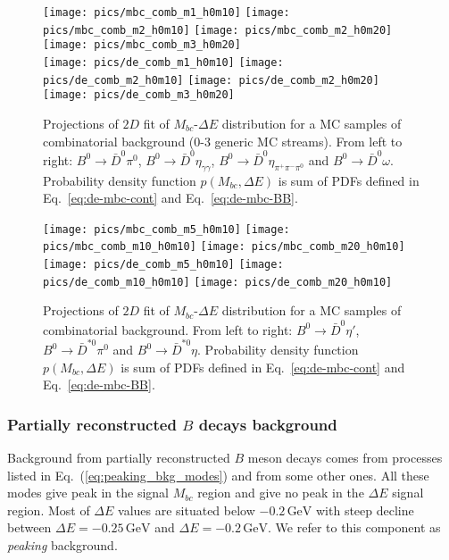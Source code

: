 \documentclass[preprint,aps,showpacs]{revtex4}
\newcommand{\bdpi}{\ensuremath{B^0\to \bar D^0\pi^0}\xspace}
\newcommand{\bdetagg}{\ensuremath{B^0\to \bar D^0\eta_{\gamma\gamma}}\xspace}
\newcommand{\bdetap}{\ensuremath{B^0\to \bar D^0\eta\prime}\xspace}
\newcommand{\bdetappp}{\ensuremath{B^0\to \bar D^0\eta_{\pi^+\pi^-\pi^0}}\xspace}
\newcommand{\bdomega}{\ensuremath{B^0\to \bar D^0\omega}\xspace}
\newcommand{\btodstpi}{\ensuremath{B^0\to \bar D^{*0}\pi^0}\xspace}
\newcommand{\btodsteta}{\ensuremath{B^0\to \bar D^{*0}\eta}\xspace}
\newcommand{\de}{\ensuremath{\Delta E}\xspace}
\newcommand{\mbc}{\ensuremath{M_{bc}}\xspace}
\begin{document}

\begin{figure}[htb]
 \texttt{[image: pics/mbc\_comb\_m1\_h0m10]}
 \texttt{[image: pics/mbc\_comb\_m2\_h0m10]}
 \texttt{[image: pics/mbc\_comb\_m2\_h0m20]}
 \texttt{[image: pics/mbc\_comb\_m3\_h0m20]}\\
 \texttt{[image: pics/de\_comb\_m1\_h0m10]}
 \texttt{[image: pics/de\_comb\_m2\_h0m10]}
 \texttt{[image: pics/de\_comb\_m2\_h0m20]}
 \texttt{[image: pics/de\_comb\_m3\_h0m20]}
 \caption{Projections of $2D$ fit of \mbc-\de distribution for a MC samples of combinatorial background ($0$-$3$ generic MC streams). From left to right: \bdpi, \bdetagg, \bdetappp and \bdomega. Probability density function $p(\mbc,\de)$ is sum of PDFs defined in Eq.~\ref{eq:de-mbc-cont} and Eq.~\ref{eq:de-mbc-BB}.}
\label{fig:de-mbc-cmb}
\end{figure}

\begin{figure}[htb]
 \texttt{[image: pics/mbc\_comb\_m5\_h0m10]}
 \texttt{[image: pics/mbc\_comb\_m10\_h0m10]}
 \texttt{[image: pics/mbc\_comb\_m20\_h0m10]}\\
 \texttt{[image: pics/de\_comb\_m5\_h0m10]}
 \texttt{[image: pics/de\_comb\_m10\_h0m10]}
 \texttt{[image: pics/de\_comb\_m20\_h0m10]}
 \caption{Projections of $2D$ fit of \mbc-\de distribution for a MC samples of combinatorial background. From left to right: \bdetap, \btodstpi and \btodsteta. Probability density function $p(\mbc,\de)$ is sum of PDFs defined in Eq.~\ref{eq:de-mbc-cont} and Eq.~\ref{eq:de-mbc-BB}.}
\label{fig:de-mbc-cmb-prime-star}
\end{figure}

\subsubsection{Partially reconstructed $B$ decays background}\label{sec:de_mbc_peak}
Background from partially reconstructed $B$ meson decays comes from processes listed in Eq.~(\ref{eq:peaking_bkg_modes}) and from some other ones. All these modes give peak in the signal \mbc region and give no peak in the \de signal region. Most of \de values are situated below $-0.2\,\text{GeV}$ with steep decline between $\de = -0.25\,\text{GeV}$ and $\de = -0.2\,\text{GeV}$. We refer to this component as {\it peaking} background. 
\end{document}
